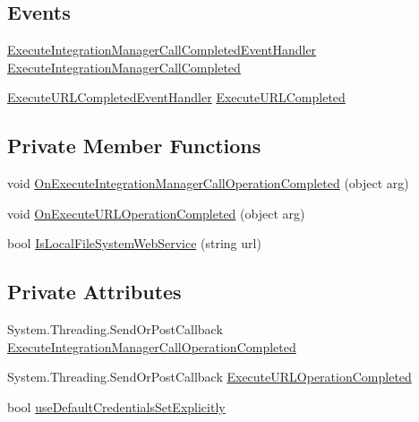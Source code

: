 \subsection*{Events}
\begin{DoxyCompactItemize}
\item 
\mbox{\hyperlink{namespace_g_f_s_c_1_1_services_1_1_end_of_term_1_1_i_m_service_a858838abf61235c305544d4b92176bf8}{Execute\+Integration\+Manager\+Call\+Completed\+Event\+Handler}} \mbox{\hyperlink{class_g_f_s_c_1_1_services_1_1_end_of_term_1_1_i_m_service_1_1_i_m_service_aa1d1d9b4e35e76c9fa8383c2b58e4689}{Execute\+Integration\+Manager\+Call\+Completed}}
\item 
\mbox{\hyperlink{namespace_g_f_s_c_1_1_services_1_1_end_of_term_1_1_i_m_service_af61025d4aca051465e8b8968b284e3d8}{Execute\+U\+R\+L\+Completed\+Event\+Handler}} \mbox{\hyperlink{class_g_f_s_c_1_1_services_1_1_end_of_term_1_1_i_m_service_1_1_i_m_service_a0c6ac0b261206b005e4b210f73ddb474}{Execute\+U\+R\+L\+Completed}}
\end{DoxyCompactItemize}
\subsection*{Private Member Functions}
\begin{DoxyCompactItemize}
\item 
void \mbox{\hyperlink{class_g_f_s_c_1_1_services_1_1_end_of_term_1_1_i_m_service_1_1_i_m_service_a2b8d358d38f0a6348058f1619c376fb2}{On\+Execute\+Integration\+Manager\+Call\+Operation\+Completed}} (object arg)
\item 
void \mbox{\hyperlink{class_g_f_s_c_1_1_services_1_1_end_of_term_1_1_i_m_service_1_1_i_m_service_a78ba3f1c02f7b61922449590c04ead73}{On\+Execute\+U\+R\+L\+Operation\+Completed}} (object arg)
\item 
bool \mbox{\hyperlink{class_g_f_s_c_1_1_services_1_1_end_of_term_1_1_i_m_service_1_1_i_m_service_a0c9cdd9b8fa0260810907e6f82c7f3e6}{Is\+Local\+File\+System\+Web\+Service}} (string url)
\end{DoxyCompactItemize}
\subsection*{Private Attributes}
\begin{DoxyCompactItemize}
\item 
System.\+Threading.\+Send\+Or\+Post\+Callback \mbox{\hyperlink{class_g_f_s_c_1_1_services_1_1_end_of_term_1_1_i_m_service_1_1_i_m_service_a4ab2d38461390844d7d1a618c85635ae}{Execute\+Integration\+Manager\+Call\+Operation\+Completed}}
\item 
System.\+Threading.\+Send\+Or\+Post\+Callback \mbox{\hyperlink{class_g_f_s_c_1_1_services_1_1_end_of_term_1_1_i_m_service_1_1_i_m_service_a607b69003e2a2ba872b7660886b97d49}{Execute\+U\+R\+L\+Operation\+Completed}}
\item 
bool \mbox{\hyperlink{class_g_f_s_c_1_1_services_1_1_end_of_term_1_1_i_m_service_1_1_i_m_service_ae47163c3bc540c0347437e3a91cea0b4}{use\+Default\+Credentials\+Set\+Explicitly}}
\end{DoxyCompactItemize}



